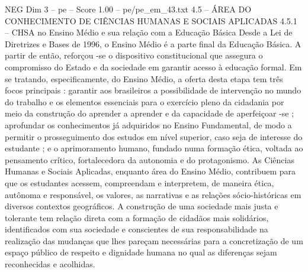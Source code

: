 \begin{textsample}{NEG Dim 3 – pe – Score 1.00 – pe/pe\_em\_43.txt}  \label{ex:f3_neg_006}
4.5 – ÁREA DO CONHECIMENTO DE CIÊNCIAS HUMANAS E SOCIAIS APLICADAS 4.5.1 – CHSA no Ensino Médio e sua relação com a Educação Básica Desde a Lei de Diretrizes e Bases de 1996, o Ensino Médio é a parte final da Educação Básica.
A partir de então, reforçou -se o dispositivo constitucional que assegura o compromisso do Estado e da sociedade em garantir acesso à educação formal.
Em se tratando, especificamente, do Ensino Médio, a oferta desta etapa tem três focos principais : garantir aos brasileiros a possibilidade de intervenção no mundo do trabalho e os elementos essenciais para o exercício pleno da cidadania por meio da construção do aprender a aprender e da capacidade de aperfeiçoar -se ; aprofundar os conhecimentos já adquiridos no Ensino Fundamental, de modo a permitir o prosseguimento dos estudos em nível superior, caso seja de interesse do estudante ; e o aprimoramento humano, fundado numa formação ética, voltada ao pensamento crítico, fortalecedora da autonomia e do protagonismo.
As Ciências Humanas e Sociais Aplicadas, enquanto área do Ensino Médio, contribuem para que os estudantes acessem, compreendam e interpretem, de maneira ética, autônoma e responsável, os valores, as narrativas e as relações sócio-históricas em diversos contextos geográficos.
A construção de uma sociedade mais justa e tolerante tem relação direta com a formação de cidadãos mais solidários, identificados com sua sociedade e conscientes de sua responsabilidade na realização das mudanças que lhes pareçam necessárias para a concretização de um espaço público de respeito e dignidade humana no qual as diferenças sejam reconhecidas e acolhidas.

\end{textsample}
